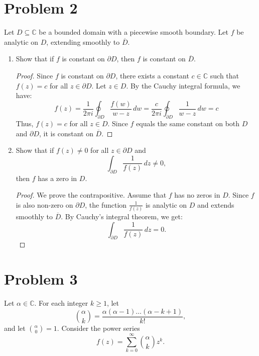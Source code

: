 \documentclass[a4paper,11pt]{article}
\newcommand{\C}{\mathbb{C}}
\newcommand{\closure}[1]{\overline{#1}}
\newcommand{\boundary}{\partial}
\begin{document}
\section*{Problem 2}
Let $D\subseteq\C$ be a bounded domain with a piecewise smooth boundary. Let $f$ be analytic on $D$, extending smoothly to $\closure{D}$.

\begin{enumerate}[label=\textbf{(\alph*)}]
    \item Show that if $f$ is constant on $\boundary D$, then $f$ is constant on $\closure{D}$.
    \begin{proof}
        Since $f$ is constant on $\boundary D$, there exists a constant $c\in\C$ such that $f(z) = c$ for all $z\in\boundary D$.
        Let $z \in D$. By the Cauchy integral formula, we have:
        \[
        f(z) = \frac{1}{2\pi i} \oint_{\boundary D} \frac{f(w)}{w - z}\,dw = \frac{c}{2\pi i} \oint_{\boundary D} \frac{1}{w - z}\,dw = c
        \]
        Thus, $f(z) = c$ for all $z \in D$. Since $f$ equals the same constant on both $D$ and $\boundary D$, it is constant on $\closure{D}$.
    \end{proof}
    
    \item Show that if $f(z)\ne0$ for all $z\in\boundary D$ and
    \[ \int_{\boundary D}\frac{1}{f(z)}\,dz\neq0, \]
    then $f$ has a zero in $D$.
    \begin{proof}
        We prove the contrapositive.
        Assume that $f$ has no zeros in $D$. 
        Since $f$ is also non-zero on $\boundary D$, the function $\frac{1}{f(z)}$ is analytic on $D$ and extends smoothly to $\closure{D}$.
        By Cauchy's integral theorem, we get: 
        \[ \int_{\boundary D}\frac{1}{f(z)}\,dz = 0. \]
    \end{proof}
\end{enumerate}

\section*{Problem 3}
Let $\alpha\in\C$. For each integer $k\ge1$, let
\[ \binom{\alpha}{k}=\frac{\alpha(\alpha-1)\dots(\alpha-k+1)}{k!}, \]
and let $\binom{\alpha}{0}=1$. Consider the power series
\[ f(z)=\sum_{k=0}^{\infty}\binom{\alpha}{k}z^{k}. \]
\end{document}
